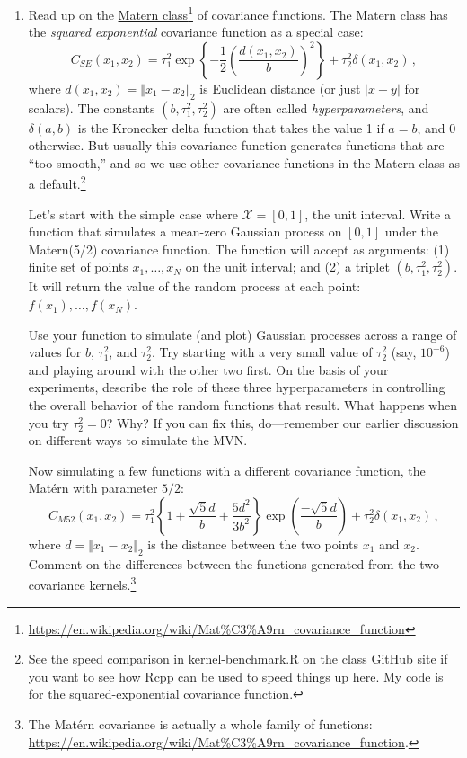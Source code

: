 \documentclass{homework}
\newcommand{\1}{\mathbf{1}}
\begin{document}
\begin{enumerate}[label=(\Alph*)]
\item   Read up on the \href{https://en.wikipedia.org/wiki/Mat\%C3\%A9rn_covariance_function}{Matern class}\footnote{\url{https://en.wikipedia.org/wiki/Mat\%C3\%A9rn_covariance_function}} of covariance functions.  The Matern class has the \textit{squared exponential} covariance function as a special case:
$$
C_{SE}(x_1, x_2) = \tau_1^2 \exp \left\{ - \frac{1}{2} \left( \frac{d(x_1, x_2)}{b} \right)^2 \right\} + \tau^2_2 \delta(x_1, x_2) \, ,
$$
where $d(x_1, x_2) = \Vert x_1 - x_2 \Vert_2$ is Euclidean distance (or just $|x-y|$ for scalars).  The constants $(b, \tau^2_1, \tau^2_2)$ are often called \textit{hyperparameters}, and $\delta(a,b)$ is the Kronecker delta function that takes the value 1 if $a=b$, and 0 otherwise.  But usually this covariance function generates functions that are ``too smooth,'' and so we use other covariance functions in the Matern class as a default.\footnote{See the speed comparison in kernel-benchmark.R on the class GitHub site if you want to see how Rcpp can be used to speed things up here.  My code is for the squared-exponential covariance function.}

Let's start with the simple case where $\mathcal{X} = [0,1]$, the unit interval.  Write a function that simulates a mean-zero Gaussian process on $[0,1]$ under the Matern(5/2) covariance function.  The function will accept as arguments: (1) finite set of points $x_1, \ldots, x_N$ on the unit interval; and (2) a triplet $(b, \tau^2_1, \tau^2_2)$. It will return the value of the random process at each point: $f(x_1), \ldots, f(x_N)$.

Use your function to simulate (and plot) Gaussian processes across a range of values for $b$, $\tau^2_1$, and $\tau^2_2$.  Try starting with a very small value of $\tau^2_2$ (say, $10^{-6}$) and playing around with the other two first.  On the basis of your experiments, describe the role of these three hyperparameters in controlling the overall behavior of the random functions that result.  What happens when you try $\tau^2_2 = 0$? Why?  If you can fix this, do---remember our earlier discussion on different ways to simulate the MVN.

Now simulating a few functions with a different covariance function, the Mat\'ern with parameter $5/2$:
$$
C_{M52}(x_1, x_2) = \tau_1^2 \left\{ 1 + \frac{\sqrt{5}d}{b} + \frac{5d^2}{3b^2} \right\} \exp\left( \frac{-\sqrt{5}d}{b} \right) + \tau^2_2 \delta(x_1, x_2) \, ,
$$
where $d = \Vert x_1 - x_2 \Vert_2$ is the distance between the two points $x_1$ and $x_2$.  Comment on the differences between the functions generated from the two covariance kernels.\footnote{The Mat\'ern covariance is actually a whole family of functions: \url{https://en.wikipedia.org/wiki/Mat\%C3\%A9rn_covariance_function}.}


\end{enumerate}
\end{document}
